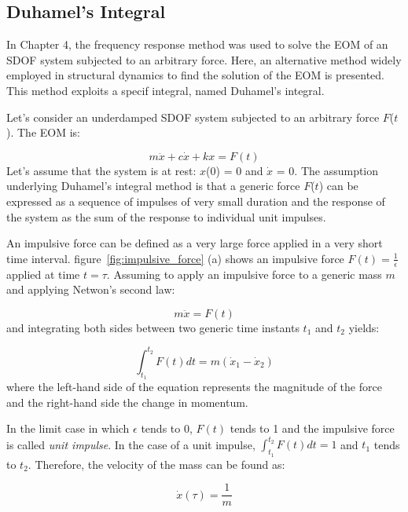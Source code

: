 \documentclass[12pt,letter]{article}
\begin{document}
\subsection{Duhamel's Integral}

In Chapter 4, the frequency response method was used to solve the EOM of an SDOF system subjected to an arbitrary force. Here, an alternative method widely employed in structural dynamics to find the solution of the EOM is presented. This method exploits a specif integral, named Duhamel's integral. 

Let's consider an underdamped SDOF system subjected to an arbitrary force $F$($t$). The EOM is:

\begin{equation}
m \ddot{x} + c \dot{x} + k x = F(t)
\end{equation}
Let's assume that the system is at rest: $x$(0) = 0 and $\dot{x}$ = 0. The assumption underlying Duhamel's integral method is that a generic force $F$($t$) can be expressed as a sequence of impulses of very small duration and the response of the system as the sum of the response to individual unit impulses. 

An impulsive force can be defined as a very large force applied in a very short time interval. figure~\ref{fig:impulsive_force} (a) shows an impulsive force $F(t) = \frac{1}{\epsilon}$ applied at time $t = \tau$. Assuming to apply an impulsive force to a generic mass $m$ and applying Netwon's second law:

\begin{equation}
m \ddot{x} = F(t)
\end{equation}
and integrating both sides between two generic time instants $t_1$ and $t_2$ yields:

\begin{equation}
\int_{t_1}^{t_2} F(t) dt = m (\dot{x}_1 - \dot{x}_2)
\end{equation}
where the left-hand side of the equation represents the magnitude of the force and the right-hand side the change in momentum. 

In the limit case in which $\epsilon$ tends to 0, $F(t)$ tends to 1 and the impulsive force is called \emph{unit impulse}. In the case of a unit impulse, $\int_{t_1}^{t_2} F(t) dt = 1$ and $t_1$ tends to $t_2$. Therefore, the velocity of the mass can be found as:

\begin{equation} \label{Eq_vel}
\dot{x}(\tau)=\frac{1}{m}
\end{equation}
\end{document}
